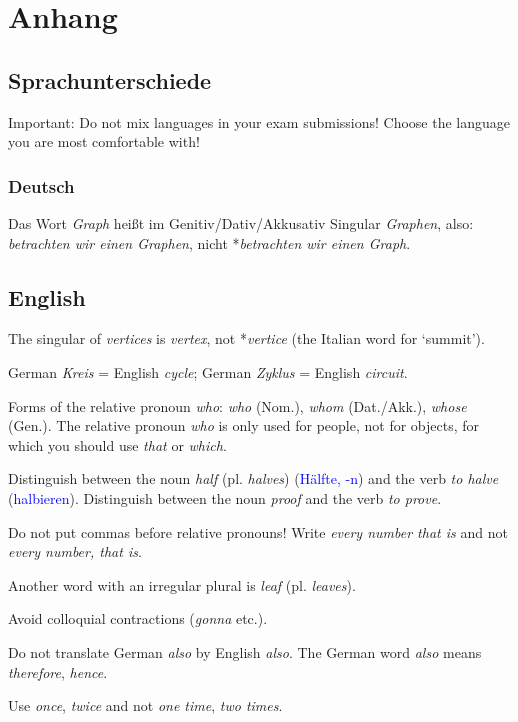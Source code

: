 \documentclass[a4paper]{article}
\begin{document}
\newpage
\section{Anhang}
\subsection{Sprachunterschiede}
Important: Do not mix languages in your exam submissions! Choose the language you are most comfortable with!

\subsubsection{Deutsch}

Das Wort \emph{Graph} hei\ss t im Genitiv/Dativ/Akkusativ Singular \emph{Graphen}, also: \emph{betrachten wir einen Graphen}, nicht *\emph{betrachten wir einen Graph}.

\subsection{English}

The singular of \emph{vertices} is \emph{vertex}, not *\emph{vertice} (the Italian word for `summit').

German \emph{Kreis} = English \emph{cycle}; German \emph{Zyklus} = English \emph{circuit}.

Forms of the relative pronoun \emph{who}: \emph{who} (Nom.), \emph{whom} (Dat./Akk.), \emph{whose} (Gen.). The relative pronoun \emph{who} is only used for people, not for objects, for which you should use \emph{that} or \emph{which}.

Distinguish between the noun \emph{half} (pl. \emph{halves}) (\textcolor{blue}{Hälfte, -n}) and the verb \emph{to halve} (\textcolor{blue}{halbieren}). Distinguish between the noun \emph{proof} and the verb \emph{to prove}.

Do not put commas before relative pronouns! Write \emph{every number that is} and not \emph{every number, that is}.

Another word with an irregular plural is \emph{leaf} (pl. \emph{leaves}).

Avoid colloquial contractions (\emph{gonna} etc.).

Do not translate German \emph{also} by English \emph{also}. The German word \emph{also} means \emph{therefore}, \emph{hence}.

Use \emph{once}, \emph{twice} and not \emph{one time}, \emph{two times}.
\end{document}
